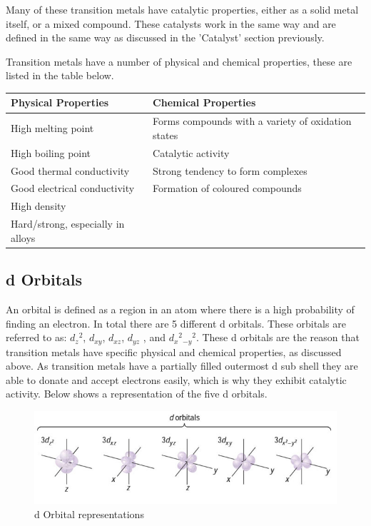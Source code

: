 Many of these transition metals have catalytic properties, either as a solid metal itself, or a mixed compound. These catalysts work in the same way and are defined in the same way as discussed in the 'Catalyst' section previously.

Transition metals have a number of physical and chemical properties, these are listed in the table below.

\begin{center}
\begin{tabular}{|l|l|}
    \hline
    \textbf{Physical Properties} & \textbf{Chemical Properties} \\ \hline
High melting point & Forms compounds with a variety of oxidation states \\ \hline
High boiling point & Catalytic activity \\ \hline
Good thermal conductivity & Strong tendency to form complexes \\ \hline
Good electrical conductivity & Formation of coloured compounds \\ \hline
High density & \\ \hline
Hard/strong, especially in alloys & \\ \hline
\end{tabular}

\label{tab:Transition Metal Properties}
\end{center}





	\subsection{d Orbitals}

An orbital is defined as a region in an atom where there is a high probability of finding an electron. In total there are 5 different d orbitals. These orbitals are referred to as: $d_z$$^2$, $d_{xy}$, $d_{xz}$, $d_{yz}$ , and $d_x$$^2$$_{-y}$$^2$. These d orbitals are the reason that transition metals have specific physical and chemical properties, as discussed above. As transition metals have a partially filled outermost d sub shell they are able to donate and accept electrons easily, which is why they exhibit catalytic activity. Below shows a representation of the five d orbitals.


\begin{figure}[H]
    \includegraphics[width=\textwidth]{./Planning/Images/DOrbitals.jpg}
    \caption{d Orbital representations} \label{fig:D Orbitals}
\end{figure}
	

